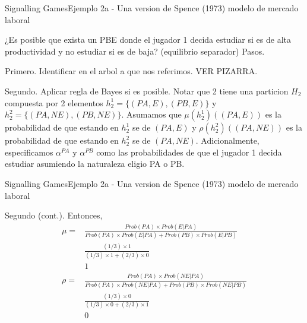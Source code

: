 \documentclass[notes, 11pt]{beamer} %
\newenvironment{wideitemize}{\itemize\addtolength{\itemsep}{10pt}}{\enditemize}
\begin{document}
\begin{frame}{Signalling Games}{Ejemplo 2a - Una version de Spence (1973) modelo de mercado laboral}
	\begin{wideitemize}
		\item<1-> ¿Es posible que exista un PBE donde el jugador 1 decida estudiar si es de alta productividad y no estudiar si es de baja? (equilibrio separador) Pasos.
		\item<2-> Primero. Identificar en el arbol a que nos referimos. VER PIZARRA.
		\item<3-> Segundo. Aplicar regla de Bayes si es posible. Notar que 2 tiene una particion $H_{2}$ compuesta por 2 elementos $h_{2}^{1} = \{(PA,E), (PB,E)\}$ y $h_{2}^{2} = \{(PA,NE),(PB,NE)\}$. Asumamos que $\mu(h_{2}^{1})((PA,E))$ es la probabilidad de que estando en $h_{2}^{1}$ se de $(PA,E)$ y $\rho(h_{2}^{2})((PA,NE))$ es la probabilidad de que estando en $h_{2}^{2}$ se de $(PA,NE)$. Adicionalmente, especificamos $\alpha^{PA}$ y $\alpha^{PB}$ como las probabilidades de que el jugador 1 decida estudiar asumiendo la naturaleza eligio PA o PB. 
	\end{wideitemize}
\end{frame}


\begin{frame}{Signalling Games}{Ejemplo 2a - Una version de Spence (1973) modelo de mercado laboral}
	\begin{wideitemize}
		\item<1-> Segundo (cont.). Entonces,
		\begin{align*}
			\mu = & \frac{ Prob(PA) \times Prob(E|PA) }{ Prob(PA)\times Prob(E|PA) + Prob(PB)\times Prob(E|PB) } \\
			& \frac{ (1/3) \times 1 }{ (1/3) \times 1 + (2/3) \times 0 } \\
			& 1 \\
			\rho = & \frac{ Prob(PA) \times Prob(NE|PA) }{ Prob(PA)\times Prob(NE|PA) + Prob(PB)\times Prob(NE|PB) } \\
			& \frac{ (1/3) \times 0 }{ (1/3) \times 0 + (2/3) \times 1 } \\
			& 0
		\end{align*}
	\end{wideitemize}
\end{frame}
\end{document}
